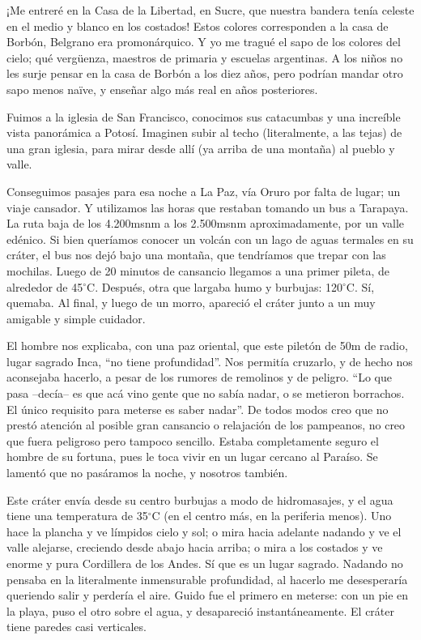 ¡Me entreré en la Casa de la Libertad, en Sucre, que nuestra
bandera tenía celeste en el medio y blanco en los costados! Estos colores
corresponden a la casa de Borbón, Belgrano era promonárquico. Y yo me tragué
el sapo de los colores del cielo; qué verg\"uenza, maestros de primaria y
escuelas argentinas. A los niños no les surje pensar en la casa de Borbón a
los diez años, pero podrían mandar otro sapo menos na\"ive, y enseñar algo
más real en años posteriores.

Fuimos a la iglesia de San Francisco, conocimos sus catacumbas y una increíble
vista panorámica a Potosí. Imaginen subir al techo (literalmente, a las tejas)
de una gran iglesia, para mirar desde allí (ya arriba de una montaña) al
pueblo y valle.

Conseguimos pasajes para esa noche a La Paz, vía Oruro por falta de lugar; un
viaje cansador. Y utilizamos las horas que restaban tomando un bus a Tarapaya.
La ruta baja de los 4.200msnm a los 2.500msnm aproximadamente, por un valle
edénico. Si bien queríamos conocer un volcán con un lago de aguas termales en
su cráter, el bus nos dejó bajo una montaña, que tendríamos que trepar con
las mochilas. Luego de 20 minutos de cansancio llegamos a una primer pileta, de
alrededor de 45$^\circ$C. Después, otra que largaba humo y burbujas:
120$^\circ$C. Sí, quemaba. Al final, y luego de un morro, apareció el cráter
junto a un muy amigable y simple cuidador.

El hombre nos explicaba, con una paz oriental, que este piletón de 50m de
radio, lugar sagrado Inca, ``no tiene profundidad''. Nos permitía cruzarlo, y
de hecho nos aconsejaba hacerlo, a pesar de los rumores de remolinos y de
peligro. ``Lo que pasa --decía-- es que acá vino gente que no sabía nadar, o
se metieron borrachos. El único requisito para meterse es saber
nadar''. De todos modos creo que no prestó atención al posible gran cansancio
o relajación de los pampeanos, no creo que fuera peligroso pero tampoco
sencillo. Estaba completamente seguro el hombre de su fortuna, pues le toca
vivir en un lugar cercano al Paraíso. Se lamentó que no pasáramos la noche, y
nosotros también.

Este cráter envía desde su centro burbujas a modo de hidromasajes, y el agua
tiene una temperatura de 35$^\circ$C (en el centro más, en la periferia menos).
Uno hace la plancha y ve límpidos cielo y sol; o mira hacia adelante nadando y
ve el valle alejarse, creciendo desde abajo hacia arriba; o mira a los costados
y ve enorme y pura Cordillera de los Andes. Sí que es un lugar sagrado. Nadando
no pensaba en la literalmente inmensurable profundidad, al hacerlo me
desesperaría queriendo salir y perdería el aire. Guido fue el primero en
meterse: con un pie en la playa, puso el otro sobre el agua, y desapareció
instantáneamente. El cráter tiene paredes casi verticales.

